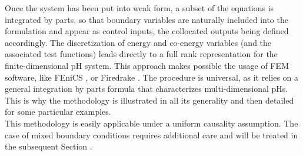 Once the system has been put into weak form, a subset of the equations is integrated by parts, so that boundary variables are naturally included into the formulation and appear as control inputs, the collocated outputs being defined accordingly. The discretization of energy and co-energy variables (and the associated test functions) leads directly to a full rank representation for the finite-dimensional pH system.  This approach makes possible the usage of FEM software, like FEniCS \cite{logg2012}, or Firedrake \cite{rathgeber2017firedrake}. The procedure is universal, as it relies on a general integration by parts formula that characterizes multi-dimensional pHs. This is why the methodology is illustrated in all its generality and then detailed for some particular examples.  \\

This methodology is easily applicable under a uniform causality assumption. The case of mixed boundary conditions requires additional care and will be treated in the subsequent Section .


